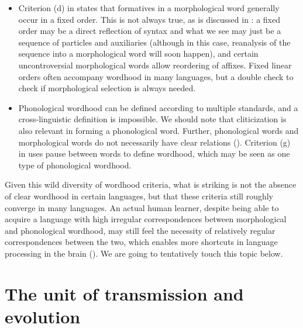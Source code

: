 \documentclass[a4paper, oneside, scheme=plain, 12pt]{article}
\newcommand*{\citepage}[1]{p.~{#1}}
\begin{document}
\begin{itemize}
    \item Criterion (d) in \citet[\citepage{14}]{dixon2010basic2} states that formatives in a morphological word generally occur in a fixed order.
    This is not always true, as is discussed in :
    a fixed order may be a direct reflection of syntax
    and what we see may just be a sequence of particles and auxiliaries
    (although in this case, reanalysis of the sequence into a morphological word will soon happen),
    and certain uncontroversial morphological words allow reordering of affixes.
    Fixed linear orders often accompany wordhood in many languages,
    but a double check to check if morphological selection is always needed.

    \item Phonological wordhood can be defined according to multiple standards,
    and a cross-linguistic definition is impossible.
    We should note that cliticization is also relevant in forming a phonological word.
    Further, phonological words and morphological words do not necessarily have clear relations
    ().
    Criterion (g) in \citet[\citepage{18}]{dixon2010basic2} uses pause between words to define  wordhood, which may be seen as one type of phonological wordhood.
\end{itemize}

Given this wild diversity of wordhood criteria,
what is striking is not the absence of clear wordhood in certain languages,
but that these criteria still roughly converge in many languages.
An actual human learner, despite being able to acquire a language with high irregular correspondences between morphological and phonological wordhood,
may still feel the necessity of relatively regular correspondences between the two,
which enables more shortcuts in language processing in the brain ().
We are going to tentatively touch this topic below.

\section{The unit of transmission and evolution}\label{sec:unit-of-transmission}
\end{document}
